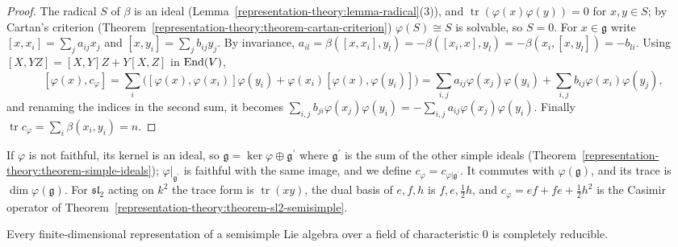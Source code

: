 \begin{proof}
The radical $S$ of $\beta$ is an ideal (Lemma~\ref{representation-theory:lemma-radical}(3)), and $\operatorname{tr}(\varphi(x)\varphi(y)) = 0$ for $x, y \in S$; by Cartan's
criterion (Theorem~\ref{representation-theory:theorem-cartan-criterion}) $\varphi(S) \cong S$ is solvable, so $S = 0$. For $x \in \mathfrak{g}$ write $[x, x_i] = \sum_ja_{ij}x_j$ and
$[x, y_i] = \sum_jb_{ij}y_j$. By invariance, $a_{il} = \beta([x, x_i], y_l) = -\beta([x_i, x], y_l) = -\beta(x_i, [x, y_l]) = -b_{li}$. Using
$[X, YZ] = [X, Y]Z + Y[X, Z]$ in $\operatorname{End}(V)$,
\[
[\varphi(x), c_\varphi] = \sum_i\bigl([\varphi(x), \varphi(x_i)]\varphi(y_i) + \varphi(x_i)[\varphi(x), \varphi(y_i)]\bigr) = \sum_{i,j}a_{ij}\varphi(x_j)\varphi(y_i) +
\sum_{i,j}b_{ij}\varphi(x_i)\varphi(y_j),
\]
and renaming the indices in the second sum, it becomes $\sum_{i,j}b_{ji}\varphi(x_j)\varphi(y_i) = -\sum_{i,j}a_{ij}\varphi(x_j)\varphi(y_i)$. Finally
$\operatorname{tr}c_\varphi = \sum_i\beta(x_i, y_i) = n$.
\end{proof}

If $\varphi$ is not faithful, its kernel is an ideal, so $\mathfrak{g} = \ker\varphi \oplus \mathfrak{g}^{\prime}$ where $\mathfrak{g}^{\prime}$ is the sum of the other simple ideals
(Theorem~\ref{representation-theory:theorem-simple-ideals}); $\varphi|_{\mathfrak{g}^{\prime}}$ is faithful with the same image, and we define
$c_\varphi = c_{\varphi|\mathfrak{g}^{\prime}}$. It commutes with $\varphi(\mathfrak{g})$, and its trace is $\dim\varphi(\mathfrak{g})$. For $\mathfrak{sl}_2$ acting on $k^2$ the
trace form is $\operatorname{tr}(xy)$, the dual basis of $e, f, h$ is $f, e, \frac12h$, and $c_\varphi = ef + fe + \frac12h^2$ is the Casimir operator of
Theorem~\ref{representation-theory:theorem-sl2-semisimple}.

\begin{theorem}[Weyl]\label{representation-theory:theorem-weyl}
Every finite-dimensional representation of a semisimple Lie algebra over a field of characteristic $0$ is completely reducible.
\end{theorem}

